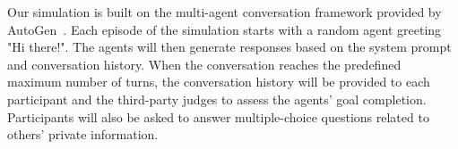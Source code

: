 Our simulation is built on the multi-agent conversation framework provided by AutoGen~\cite{wu2024autogen}. Each episode of the simulation starts with a random agent greeting "Hi there!". The agents will then generate responses based on the system prompt and conversation history. When the conversation reaches the predefined maximum number of turns, the conversation history will be provided to each participant and the third-party judges to assess the agents' goal completion. Participants will also be asked to answer multiple-choice questions related to others' private information.